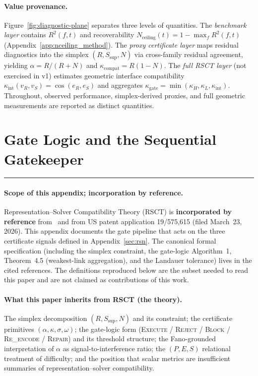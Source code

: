 \documentclass{article}
\begin{document}
\paragraph{Value provenance.} Figure~\ref{fig:diagnostic-plane} separates three levels of quantities. The \emph{benchmark layer} contains $R^2(f,t)$ and recoverability $N_{\text{ceiling}}(t) = 1 - \max_{f} R^2(f,t)$ (Appendix~\ref{app:nceiling_method}). The \emph{proxy certificate layer} maps residual diagnostics into the simplex $(R, S_{\text{sup}}, N)$ via cross-family residual agreement, yielding $\alpha = R/(R+N)$ and $\kappa_{\text{compat}} = R(1-N)$. The \emph{full RSCT layer} (not exercised in v1) estimates geometric interface compatibility $\kappa_{\text{int}}(v_R, v_S) = \cos(e_R, e_S)$ and aggregates $\kappa_{\text{gate}} = \min(\kappa_H, \kappa_L, \kappa_{\text{int}})$. Throughout, observed performance, simplex-derived proxies, and full geometric measurements are reported as distinct quantities.

\section{Gate Logic and the Sequential Gatekeeper}
\label{app:rsct_theory}

\noindent\rule{\textwidth}{0.8pt}

\paragraph{Scope of this appendix; incorporation by reference.}
Representation--Solver Compatibility Theory (RSCT) is \textbf{incorporated by reference} from~\citep{martin2026rsct} and from US patent application 19/575{,}615 (filed March~23, 2026). This appendix documents the gate pipeline that acts on the three certificate signals defined in Appendix~\ref{sec:rsn}. The canonical formal specification (including the simplex constraint, the gate-logic Algorithm~1, Theorem~4.5 (weakest-link aggregation), and the Landauer tolerance) lives in the cited references. The definitions reproduced below are the subset needed to read this paper and are not claimed as contributions of this work.

\paragraph{What this paper inherits from RSCT (the theory).}
The simplex decomposition $(R, S_{\text{sup}}, N)$ and its constraint; the certificate primitives $(\alpha, \kappa, \sigma, \omega)$; the gate-logic form (\textsc{Execute} / \textsc{Reject} / \textsc{Block} / \textsc{Re\_encode} / \textsc{Repair}) and its threshold structure; the Fano-grounded interpretation of $\alpha$ as signal-to-interference ratio; the $(P, E, S)$ relational treatment of difficulty; and the position that scalar metrics are insufficient summaries of representation--solver compatibility.
\end{document}
